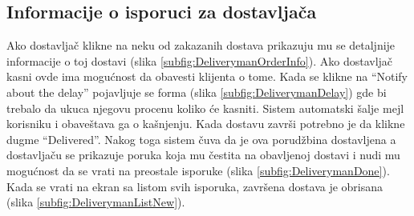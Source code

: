 \subsection{Informacije o isporuci za dostavljača}

Ako dostavljač klikne na neku od zakazanih dostava prikazuju mu se detaljnije informacije o toj dostavi (slika \ref{subfig:DeliverymanOrderInfo}).
Ako dostavljač kasni ovde ima mogućnost da obavesti klijenta o tome. Kada se klikne na ``Notify about the delay'' pojavljuje se forma (slika \ref{subfig:DeliverymanDelay}) gde bi trebalo da ukuca njegovu procenu koliko će kasniti. Sistem automatski šalje mejl korisniku i obaveštava ga o kašnjenju.
Kada dostavu završi potrebno je da klikne dugme ``Delivered''. Nakog toga sistem čuva da je ova porudžbina dostavljena a dostavljaču se prikazuje poruka koja mu čestita na obavljenoj dostavi i nudi mu mogućnost da se vrati na preostale isporuke (slika \ref{subfig:DeliverymanDone}). Kada se vrati na ekran sa listom svih isporuka, završena dostava je obrisana (slika \ref{subfig:DeliverymanListNew}).




